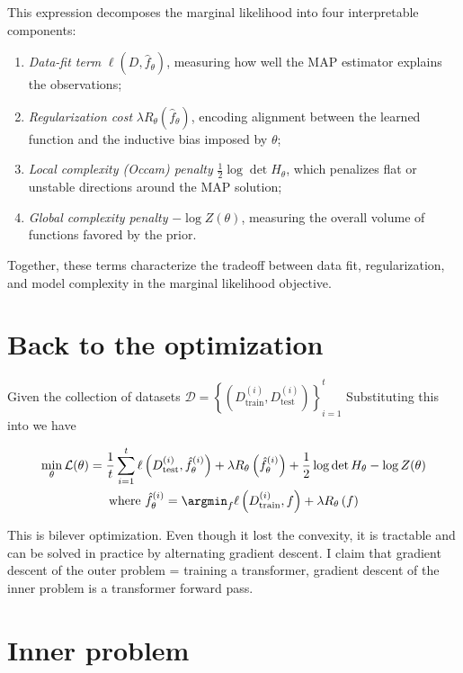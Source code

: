 This expression decomposes the marginal likelihood into four interpretable
components:
\begin{enumerate}
	\item \emph{Data-fit term} $\ell(D,\hat f_\theta)$, measuring how well the
	      MAP estimator explains the observations;
	\item \emph{Regularization cost} $\lambda R_\theta(\hat f_\theta)$,
	      encoding alignment between the learned function and the inductive bias
	      imposed by $\theta$;
	\item \emph{Local complexity (Occam) penalty}
	      $\frac{1}{2}\log\det H_\theta$, which penalizes flat or unstable directions
	      around the MAP solution;
	\item \emph{Global complexity penalty} $-\log Z(\theta)$, measuring the
	      overall volume of functions favored by the prior.
\end{enumerate}

Together, these terms characterize the tradeoff between data fit,
regularization, and model complexity in the marginal likelihood objective.


\section{Back to the optimization}
Given the collection of datasets $\mathcal{D} = \left\{\left(D^{(i)}_{\text{train}}, D^{(i)}_{\text{test}}\right)\right\}_{i=1}^t$
Substituting this into  we have

\begin{gather*}
	\min_\theta \mathcal{L}(\theta) =
	\frac{1}{t} \sum_{i=1}^t
	\ell\left(D_{\text{test}}^{(i)},\hat f^{(i)}_\theta\right)
	+
	\lambda R_\theta\left(\hat f^{(i)}_\theta\right)
	+
	\frac{1}{2}\log\det H_\theta
	-
	\log Z(\theta)
	\\
	\text{where } \hat f_\theta^{(i)} = \argmin_f
	\ell\left(D_{\text{train}}^{(i)},  f\right)
	+
	\lambda R_\theta\left(f\right)
\end{gather*}

This is bilever optimization. Even though it lost the convexity, it is tractable and can be solved in practice by alternating gradient descent. I claim that gradient descent of the outer problem  = training a transformer, gradient descent of the inner problem is a transformer forward pass.

\section{Inner problem}

